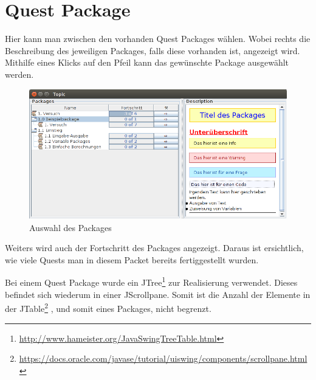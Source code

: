 \section{Quest Package}
Hier kann man zwischen den vorhanden Quest Packages wählen. Wobei rechts die Beschreibung des jeweiligen Packages, falls diese vorhanden ist, angezeigt wird. Mithilfe eines Klicks auf den Pfeil kann das gewünschte Package ausgewählt werden.

\begin{figure}[h] 
  \centering
     \includegraphics[width=1\textwidth]{./media/images/gui/package-auswahl.png}
  \caption{Auswahl des Packages}
  \label{fig:Package_Auswahl}
\end{figure}

Weiters wird auch der Fortschritt des Packages angezeigt. Daraus ist ersichtlich, wie viele Quests man in diesem Packet bereits fertiggestellt wurden.

Bei einem Quest Package wurde ein JTree\footnote{\url{http://www.hameister.org/JavaSwingTreeTable.html}}  zur Realisierung verwendet. Dieses befindet sich wiederum in einer JScrollpane. Somit ist die Anzahl der Elemente in der JTable\footnote{\url{https://docs.oracle.com/javase/tutorial/uiswing/components/scrollpane.html}}  , und somit eines Packages, nicht begrenzt.
